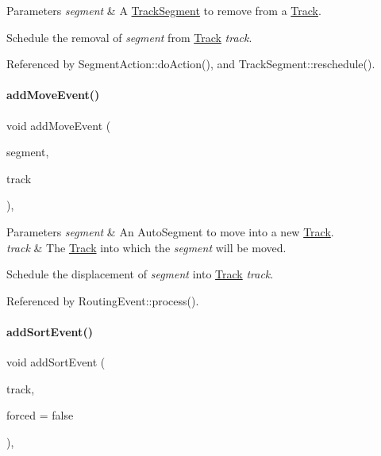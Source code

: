 \begin{DoxyParams}{Parameters}
{\em segment} & A \hyperlink{classKite_1_1TrackSegment}{Track\+Segment} to remove from a \hyperlink{classKite_1_1Track}{Track}.\\
\hline
\end{DoxyParams}
Schedule the removal of {\itshape segment} from \hyperlink{classKite_1_1Track}{Track} {\itshape track}. 

Referenced by Segment\+Action\+::do\+Action(), and Track\+Segment\+::reschedule().

\mbox{\label{classKite_1_1Session_aa42e4cb9e2559c00d68821f535ef7838}} 
\paragraph{\texorpdfstring{add\+Move\+Event()}{addMoveEvent()}}
{\footnotesize\ttfamily void add\+Move\+Event (\begin{DoxyParamCaption}\item[{\hyperlink{classKite_1_1TrackElement}{Track\+Element} $\ast$}]{segment,  }\item[{\hyperlink{classKite_1_1Track}{Track} $\ast$}]{track }\end{DoxyParamCaption})\hspace{0.3cm}{\ttfamily [inline]}, {\ttfamily [static]}}


\begin{DoxyParams}{Parameters}
{\em segment} & An Auto\+Segment to move into a new \hyperlink{classKite_1_1Track}{Track}. \\
\hline
{\em track} & The \hyperlink{classKite_1_1Track}{Track} into which the {\itshape segment} will be moved.\\
\hline
\end{DoxyParams}
Schedule the displacement of {\itshape segment} into \hyperlink{classKite_1_1Track}{Track} {\itshape track}. 

Referenced by Routing\+Event\+::process().

\mbox{\label{classKite_1_1Session_a990d32b1f1ea661b088a05f86319772f}} 
\paragraph{\texorpdfstring{add\+Sort\+Event()}{addSortEvent()}}
{\footnotesize\ttfamily void add\+Sort\+Event (\begin{DoxyParamCaption}\item[{\hyperlink{classKite_1_1Track}{Track} $\ast$}]{track,  }\item[{bool}]{forced = {\ttfamily false} }\end{DoxyParamCaption})\hspace{0.3cm}{\ttfamily [inline]}, {\ttfamily [static]}}


